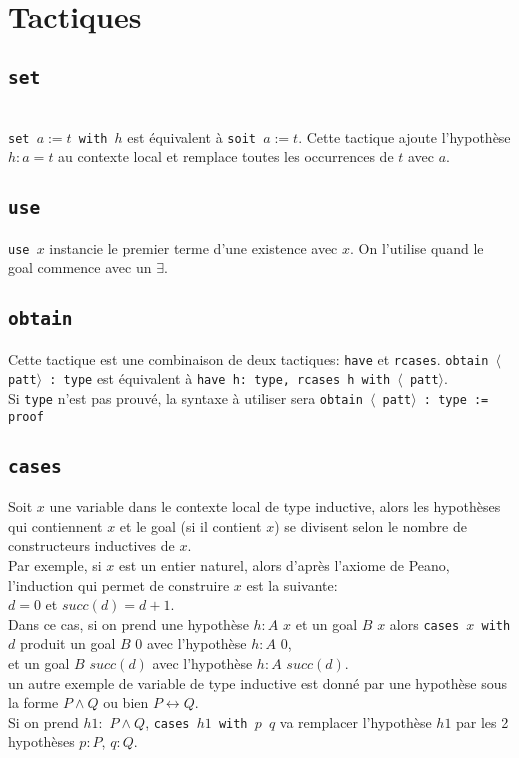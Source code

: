    \section{Tactiques}
    \subsection{\texttt{set}}\\
    \texttt{set $a := t$ with $h$} est équivalent à \texttt{soit $a := t$}. Cette tactique ajoute l'hypothèse $h : a = t$ au contexte local et remplace toutes les occurrences de $t$ avec $a$.
    \subsection{\texttt{use}}
    \texttt{use $x$} instancie le premier terme d'une existence avec $x$. On l'utilise quand le goal commence avec un $\exists$. 
    \subsection{\texttt{obtain}}
    Cette tactique est une combinaison de deux tactiques: \texttt{have} et \texttt{rcases}.
    \texttt{obtain $\langle$ patt$\rangle$ : type} est équivalent à \texttt{have h: type, rcases h with $\langle$ patt$\rangle$}. \\ Si \texttt{type} n'est pas prouvé, la syntaxe à utiliser sera \texttt{obtain $\langle$ patt$\rangle$ : type := proof}
    \subsection{\texttt{cases}}
    Soit $x$ une variable dans le contexte local de type inductive, alors les hypothèses qui contiennent $x$ et le goal (si il contient $x$) se divisent selon le nombre de constructeurs inductives de $x$.\\ Par exemple, si $x$ est un entier naturel, alors d'après l'axiome de Peano, l'induction qui permet de construire $x$ est la suivante:\\ $d=0$ et $succ(d)=d+1$. \\ Dans ce cas, si on prend une hypothèse $h:A$ $x$ et un goal $B$ $x$ alors \texttt{cases $x$ with $d$} produit un goal $B$ $0$ avec l'hypothèse $h:A$ $0$, \\et un goal $B$ $succ(d)$ avec l'hypothèse $h:A$ $succ(d)$. \\
    un autre exemple de variable de type inductive est donné par une hypothèse sous la forme $P\wedge Q$ ou bien $P\leftrightarrow Q$.\\ Si on prend $h1:$ $P\wedge Q$, \texttt{cases $h1$ with $p$ $q$} va remplacer l'hypothèse $h1$ par les 2 hypothèses $p:P$, $q:Q$.
